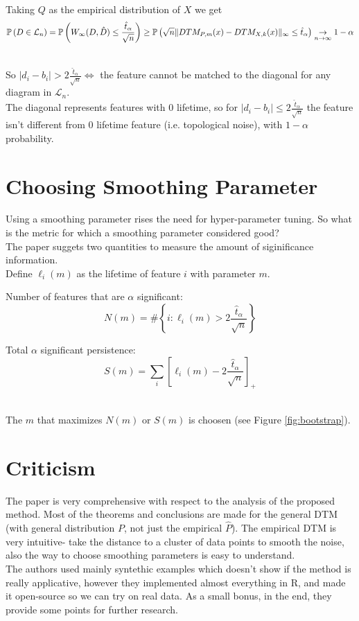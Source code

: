 \documentclass[11pt]{article}
\theoremstyle{definition}
\theoremstyle{definition}
\begin{document}
\text{ }\\
Taking $Q$ as the empirical distribution of $X$ we get
$$\mathbb{P} \left( D \in \mathcal{L}_n \right) = \mathbb{P} \left( W_\infty (D, \hat D) \leq \frac{\hat t_\alpha}{\sqrt{n}} \right) \geq \mathbb{P} \left( \sqrt{n} \mathopen\| DTM_{P,m}(x) - DTM_{X,k}(x) \mathclose\|_\infty \leq \hat t_\alpha \right) \underset{n\rightarrow \infty}{\rightarrow} 1-\alpha$$

\text{ }\\
So $|d_i - b_i| > 2\frac{\hat t_\alpha}{\sqrt{n}} \Leftrightarrow$ the feature cannot be matched to the diagonal for any diagram in $\mathcal{L}_n$.\\
The diagonal represents features with 0 lifetime, so for $|d_i - b_i| \leq 2\frac{\hat t_\alpha}{\sqrt{n}}$ the feature isn't different from 0 lifetime feature (i.e. topological noise), with $1-\alpha$ probability.

\def\tha{\hat t_\alpha}
\def\ftn{2\frac{\tha}{\sqrt{n}}}
\section{Choosing Smoothing Parameter}
Using a smoothing parameter rises the need for hyper-parameter tuning. So what is the metric for which a smoothing parameter considered good?\\
The paper suggets two quantities to measure the amount of siginificance information.\\
Define $\ell_i(m)$ as the lifetime of feature $i$ with parameter $m$.

Number of features that are $\alpha$ significant:
$$N(m) = \# \left\{ i : \ell_i(m) > \ftn \right\}$$

Total $\alpha$ significant persistence:
$$S(m) = \sum_i \left[ \ell_i(m) - \ftn \right]_+$$

\text{ }\\
The $m$ that maximizes $N(m)$ or $S(m)$ is choosen (see Figure \ref{fig:bootstrap}).



\section{Criticism}

The paper is very comprehensive with respect to the analysis of the proposed method. Most of the theorems and conclusions are made for the general DTM (with general distribution $P$, not just the empirical $\hat P$).
The empirical DTM is very intuitive- take the distance to a cluster of data points to smooth the noise, also the way to choose smoothing parameters is easy to understand.\\
The authors used mainly syntethic examples which doesn't show if the method is really applicative, however they implemented almost everything in R, and made it open-source so we can try on real data. As a small bonus, in the end, they provide some points for further research.
\end{document}
